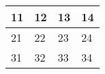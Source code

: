 \documentclass{article}
\begin{document}
\begin{tabularx}{\textwidth} {| X | X | X | X |}
 \hline
11 & 12 & 13 & 14 \\
 \hline
21 & 22 & 23 & 24 \\
 \hline
31 & 32 & 33 & 34 \\
 \hline
\end{tabularx}
\end{document}
